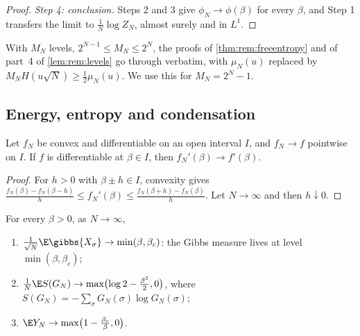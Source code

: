\begin{refsection}
\begin{proof}
\emph{Step 4: conclusion.} Steps 2 and 3 give $\phi_N\to\phi(\beta)$ for every $\beta$, and Step 1 transfers the limit to $\frac1N\log Z_N$, almost surely and in $L^1$.
\end{proof}

\begin{remark}\label{rem:rem:levels}
With $M_N$ levels, $2^{N-1}\le M_N\le2^N$, the proofs of \cref{thm:rem:freeentropy} and of part~4 of \cref{lem:rem:levels} go through verbatim, with $\mu_N(u)$ replaced by $M_NH(u\sqrt N)\ge\frac12\mu_N(u)$. We use this for $M_N=2^N-1$.
\end{remark}

\subsection{Energy, entropy and condensation}\label{sec:rem:condensation}

\begin{lemma}\label{lem:rem:convex}
Let $f_N$ be convex and differentiable on an open interval $I$, and $f_N\to f$ pointwise on $I$. If $f$ is differentiable at $\beta\in I$, then $f_N'(\beta)\to f'(\beta)$.
\end{lemma}

\begin{proof}
For $h>0$ with $\beta\pm h\in I$, convexity gives $\frac{f_N(\beta)-f_N(\beta-h)}h\le f_N'(\beta)\le\frac{f_N(\beta+h)-f_N(\beta)}h$. Let $N\to\infty$ and then $h\downarrow0$.
\end{proof}

\begin{corollary}\label{cor:rem:condensation}
For every $\beta>0$, as $N\to\infty$,
\begin{enumerate}
\item $\frac1{\sqrt N}\E\gibbs{X_\sigma}\to\min(\beta,\beta_c)$: the Gibbs measure lives at level $\min(\beta,\beta_c)$;
\item $\frac1N\E S(G_N)\to\max\bigl(\log2-\frac{\beta^2}2,0\bigr)$, where $S(G_N)=-\sum_\sigma G_N(\sigma)\log G_N(\sigma)$;
\item $\E Y_N\to\max\bigl(1-\frac{\beta_c}\beta,0\bigr)$.
\end{enumerate}
\end{corollary}


\end{refsection}

